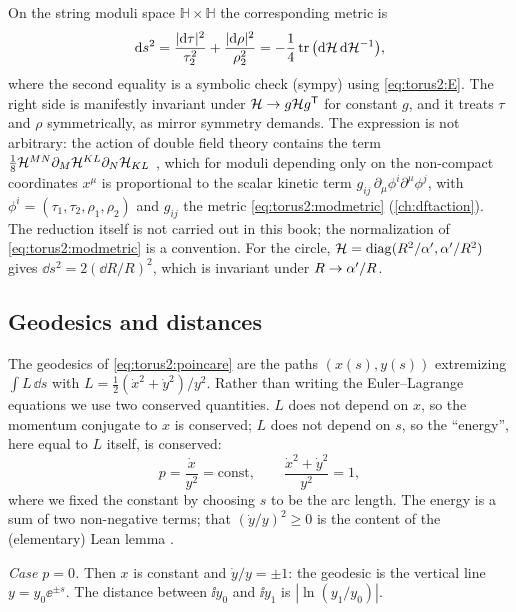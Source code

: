 On the string moduli space $\mathbb H\times\mathbb H$ the corresponding metric is
\begin{equation}\label{eq:torus2:modmetric}
 \mathrm{d} s^2=\frac{|\mathrm{d}\tau|^2}{\tau_2^2}+\frac{|\mathrm{d}\rho|^2}{\rho_2^2}
 =-\frac14\operatorname{tr}\big(\mathrm{d}\mathcal{H}\,\mathrm{d}\mathcal{H}^{-1}\big),
\end{equation}
where the second equality is a symbolic check (sympy) using \eqref{eq:torus2:E}. The right
side is manifestly invariant under $\mathcal{H}\to g\mathcal{H} g^{\mathsf T}$ for constant $g$, and it
treats $\tau$ and $\rho$ symmetrically, as mirror symmetry demands. The expression is not
arbitrary: the action of double field theory contains the term
$\frac18\mathcal{H}^{MN}\partial_M\mathcal{H}^{KL}\partial_N\mathcal{H}_{KL}$
, which for moduli depending only on the
non-compact coordinates $x^\mu$ is proportional to the scalar kinetic term
$g_{ij}\,\partial_\mu\phi^i\partial^\mu\phi^j$, with $\phi^i=(\tau_1,\tau_2,\rho_1,\rho_2)$
and $g_{ij}$ the metric \eqref{eq:torus2:modmetric} (\cref{ch:dftaction}). The reduction itself is not carried out
in this book; the normalization of \eqref{eq:torus2:modmetric} is a convention. For the
circle, $\mathcal{H}=\operatorname{diag}(R^2/\alpha',\alpha'/R^2)$ gives $\dd s^2=2(\dd R/R)^2$, which is invariant under
$R\to\alpha'/R$.

\subsection{Geodesics and distances}

The geodesics of \eqref{eq:torus2:poincare} are the paths $(x(s),y(s))$
extremizing $\int L\,\dd s$ with $L=\frac12(\dot x^2+\dot y^2)/y^2$. Rather than writing
the Euler--Lagrange equations we use two conserved quantities. $L$ does not depend on $x$,
so the momentum conjugate to $x$ is conserved; $L$ does not depend on $s$, so the
``energy'', here equal to $L$ itself, is conserved:
\begin{equation}\label{eq:torus2:conserved}
 p=\frac{\dot x}{y^2}=\text{const},\qquad
 \frac{\dot x^2+\dot y^2}{y^2}=1 ,
\end{equation}
where we fixed the constant by choosing $s$ to be the arc length. The energy is a sum of two
non-negative terms; that $(\dot y/y)^2\ge0$ is the content of the (elementary) Lean lemma
.

\emph{Case $p=0$.} Then $x$ is constant and $\dot y/y=\pm1$: the geodesic is the vertical
line $y=y_0\ee^{\pm s}$. The distance between $\ii y_0$ and $\ii y_1$ is $|\ln(y_1/y_0)|$.

